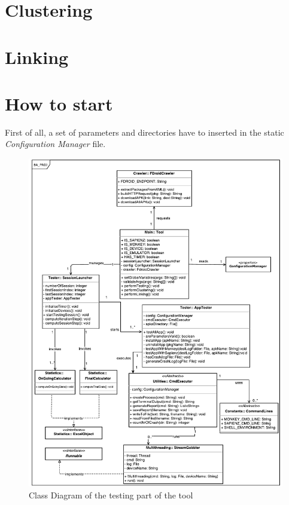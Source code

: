 \section{Clustering}

\section{Linking}

\section{How to start \toolname}
First of all, a set of parameters and directories have to inserted in the static \textit{Configuration Manager} file.


\begin{figure}[t]
\centering 
\includegraphics[width=\columnwidth]{diagrams/testing.pdf} 
\caption{Class Diagram of the testing part of the tool }
\label{testing}
\vspace{-3mm} 
\end{figure}



